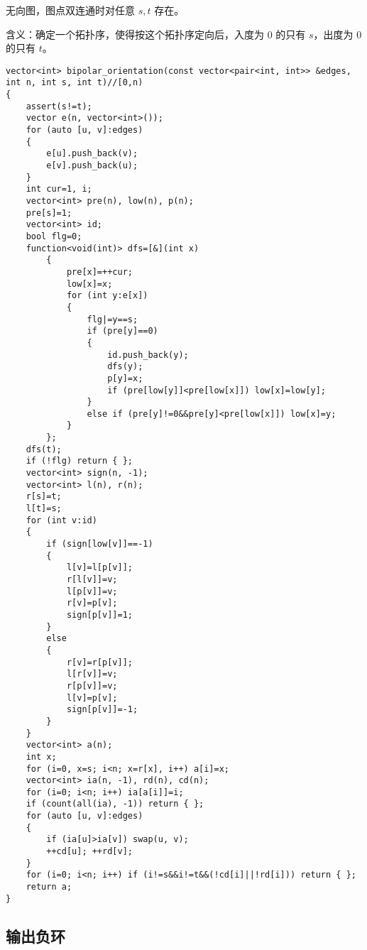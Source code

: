 \documentclass[12pt]{ctexart}
\begin{document}
无向图，图点双连通时对任意 $s,t$ 存在。

含义：确定一个拓扑序，使得按这个拓扑序定向后，入度为 $0$ 的只有 $s$，出度为 $0$ 的只有 $t$。

\begin{lstlisting}
vector<int> bipolar_orientation(const vector<pair<int, int>> &edges, int n, int s, int t)//[0,n)
{
	assert(s!=t);
	vector e(n, vector<int>());
	for (auto [u, v]:edges)
	{
		e[u].push_back(v);
		e[v].push_back(u);
	}
	int cur=1, i;
	vector<int> pre(n), low(n), p(n);
	pre[s]=1;
	vector<int> id;
	bool flg=0;
	function<void(int)> dfs=[&](int x)
		{
			pre[x]=++cur;
			low[x]=x;
			for (int y:e[x])
			{
				flg|=y==s;
				if (pre[y]==0)
				{
					id.push_back(y);
					dfs(y);
					p[y]=x;
					if (pre[low[y]]<pre[low[x]]) low[x]=low[y];
				}
				else if (pre[y]!=0&&pre[y]<pre[low[x]]) low[x]=y;
			}
		};
	dfs(t);
	if (!flg) return { };
	vector<int> sign(n, -1);
	vector<int> l(n), r(n);
	r[s]=t;
	l[t]=s;
	for (int v:id)
	{
		if (sign[low[v]]==-1)
		{
			l[v]=l[p[v]];
			r[l[v]]=v;
			l[p[v]]=v;
			r[v]=p[v];
			sign[p[v]]=1;
		}
		else
		{
			r[v]=r[p[v]];
			l[r[v]]=v;
			r[p[v]]=v;
			l[v]=p[v];
			sign[p[v]]=-1;
		}
	}
	vector<int> a(n);
	int x;
	for (i=0, x=s; i<n; x=r[x], i++) a[i]=x;
	vector<int> ia(n, -1), rd(n), cd(n);
	for (i=0; i<n; i++) ia[a[i]]=i;
	if (count(all(ia), -1)) return { };
	for (auto [u, v]:edges)
	{
		if (ia[u]>ia[v]) swap(u, v);
		++cd[u]; ++rd[v];
	}
	for (i=0; i<n; i++) if (i!=s&&i!=t&&(!cd[i]||!rd[i])) return { };
	return a;
}

\end{lstlisting}

\subsection{输出负环}
\end{document}
